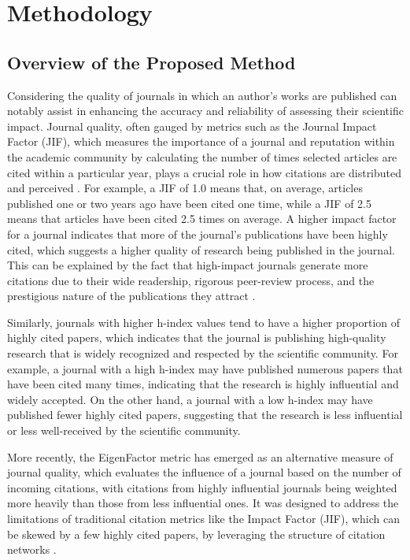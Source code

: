 \chapter{Methodology}
\label{ch:methods}

\section{Overview of the Proposed Method}

Considering the quality of journals in which an author's works are published
can notably assist in enhancing the accuracy and reliability of assessing their
scientific impact. Journal quality, often gauged by metrics such as the Journal
Impact Factor (JIF), which measures the importance of a journal and reputation
within the academic community by calculating the number of times selected
articles are cited within a particular year, plays a crucial role in how
citations are distributed and perceived \cite{garfield1999journal,
      garfield2006history}. For example, a JIF of 1.0 means that, on average,
articles published one or two years ago have been cited one time, while a JIF
of 2.5 means that articles have been cited 2.5 times on average. A higher
impact factor for a journal indicates that more of the journal's publications
have been highly cited, which suggests a higher quality of research being
published in the journal. This can be explained by the fact that high-impact
journals generate more citations due to their wide readership, rigorous
peer-review process, and the prestigious nature of the publications they
attract \cite{garfield2006history}.

Similarly, journals with higher h-index values tend to have a higher proportion
of highly cited papers, which indicates that the journal is publishing
high-quality research that is widely recognized and respected by the scientific
community. For example, a journal with a high h-index may have published
numerous papers that have been cited many times, indicating that the research
is highly influential and widely accepted. On the other hand, a journal with a
low h-index may have published fewer highly cited papers, suggesting that the
research is less influential or less well-received by the scientific community.

More recently, the EigenFactor metric has emerged as an alternative measure of
journal quality, which evaluates the influence of a journal based on the number
of incoming citations, with citations from highly influential journals being
weighted more heavily than those from less influential ones. It was designed to
address the limitations of traditional citation metrics like the Impact Factor
(JIF), which can be skewed by a few highly cited papers, by leveraging the
structure of citation networks \cite{bergstrom2007eigenfactor}.

